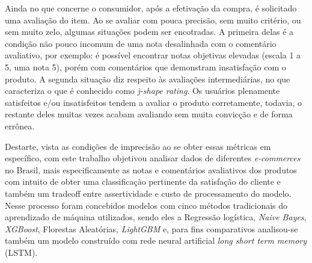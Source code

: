 Ainda no que concerne o consumidor, após a efetivação da compra, é solicitado uma avaliação do item. Ao se avaliar com pouca precisão, sem muito critério, ou sem muito zelo, algumas situações podem ser encotradas. A primeira delas é a condição não pouco incomum de uma nota desalinhada com o comentário avaliativo, por exemplo: é possível encontrar notas objetivas elevadas (escala 1 a 5, uma nota 5), porém com comentários que demonstram insatisfação com o produto. A segunda situação diz respeito às avaliações intermediárias, no que caracteriza o que é conhecido como \textit{j-shape rating}. Os usuários plenamente satisfeitos e/ou insatisfeitos tendem a avaliar o produto corretamente, todavia, o restante deles muitas vezes acabam avaliando sem muita convicção e de forma errônea.

Destarte, vista as condições de imprecisão ao se obter essas métricas em específico, com este trabalho objetivou analisar dados de diferentes \textit{e-commerces} no Brasil, mais especificamente as notas e comentários avaliativos dos produtos com intuito de obter uma classificação pertinente da satisfação do cliente e também um tradeoff entre assertividade e custo de processamento do modelo. Nesse processo foram concebidos modelos com cinco métodos tradicionais do aprendizado de máquina utilizados, sendo eles a Regressão logística, \textit{Naive Bayes}, \textit{XGBoost}, Florestas Aleatórias, \textit{LightGBM} e, para fins comparativos analisou-se também um modelo construído com rede neural artificial \textit{long short term memory} (LSTM).
